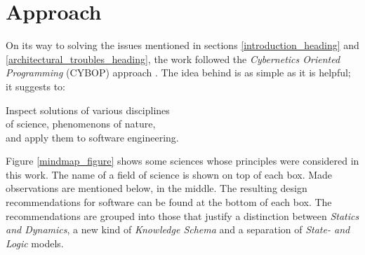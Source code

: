 %
%
%
%
%
%
%

\section{Approach}
\label{approach_heading}

On its way to solving the issues mentioned in sections
\ref{introduction_heading} and \ref{architectural_troubles_heading}, the
work followed the \emph{Cybernetics Oriented Programming} (CYBOP) approach
\cite{heller2004}. The idea behind is as simple as it is helpful; it suggests
to:

\begin{center}
    Inspect solutions of various disciplines\\
    of science, phenomenons of nature,\\
    and apply them to software engineering.
\end{center}

Figure \ref{mindmap_figure} shows some sciences whose principles were
considered in this work. The name of a field of science is shown on top of each
box. Made observations are mentioned below, in the middle. The resulting design
recommendations for software can be found at the bottom of each box. The
recommendations are grouped into those that justify a distinction between
\emph{Statics and Dynamics}, a new kind of \emph{Knowledge Schema} and a
separation of \emph{State- and Logic} models.

